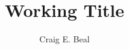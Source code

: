 \documentclass[12pt]{article}
\title{Working Title}
\author{Craig E. Beal}
\begin{document}
\maketitle



\endabstract
\end{document}
